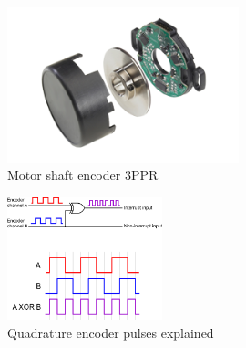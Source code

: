 \documentclass[12pt]{book}
\begin{document}
\begin{itemize}
	\begin{figure}
		\centering
		\includegraphics[width =0.6\textwidth]{Fig/Electronics/encoder.png}
		\caption{Motor shaft encoder 3PPR}
		\label{fig:encoder}
	\end{figure}
	
	\begin{figure}
		\centering
		\includegraphics[width =0.4\textwidth]{Fig/Electronics/encoder-pulses.png}
		\caption{Quadrature encoder pulses explained}
		\label{fig:encoder-pulses}
	\end{figure}


\end{itemize}
\end{document}
